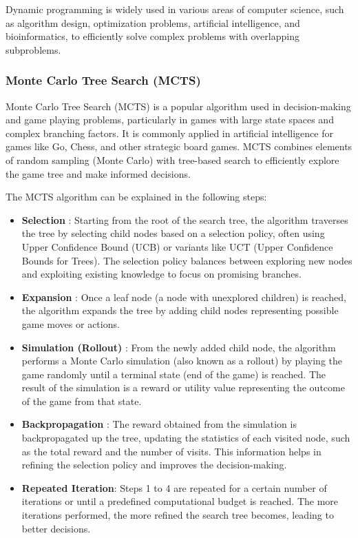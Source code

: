 Dynamic programming is widely used in various areas of computer science, such as algorithm design, optimization problems, artificial intelligence, and bioinformatics, to efficiently solve complex problems with overlapping subproblems.

\subsubsection{Monte Carlo Tree Search (MCTS)}
Monte Carlo Tree Search (MCTS) is a popular algorithm used in decision-making and game playing problems, particularly in games with large state spaces and complex branching factors. It is commonly applied in artificial intelligence for games like Go, Chess, and other strategic board games. MCTS combines elements of random sampling (Monte Carlo) with tree-based search to efficiently explore the game tree and make informed decisions.

The MCTS algorithm can be explained in the following steps:
\begin{itemize}
    \item \textbf{Selection} : Starting from the root of the search tree, the algorithm traverses the tree by selecting child nodes based on a selection policy, often using Upper Confidence Bound (UCB) or variants like UCT (Upper Confidence Bounds for Trees). The selection policy balances between exploring new nodes and exploiting existing knowledge to focus on promising branches.
    \item \textbf{Expansion} : Once a leaf node (a node with unexplored children) is reached, the algorithm expands the tree by adding child nodes representing possible game moves or actions.
    \item \textbf{Simulation (Rollout)} : From the newly added child node, the algorithm performs a Monte Carlo simulation (also known as a rollout) by playing the game randomly until a terminal state (end of the game) is reached. The result of the simulation is a reward or utility value representing the outcome of the game from that state.
    \item \textbf{Backpropagation} : The reward obtained from the simulation is backpropagated up the tree, updating the statistics of each visited node, such as the total reward and the number of visits. This information helps in refining the selection policy and improves the decision-making.
    \item \textbf{Repeated Iteration}: Steps 1 to 4 are repeated for a certain number of iterations or until a predefined computational budget is reached. The more iterations performed, the more refined the search tree becomes, leading to better decisions.
\end{itemize}


